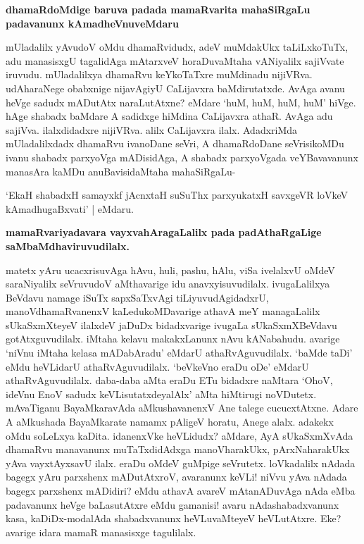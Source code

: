 {\bigskip
\noindent
{\large\bf dhamaRdoMdige baruva padada mamaRvarita mahaSiRgaLu padavanunx kAmadheVnuveMdaru}}\label{page205}
\medskip

\noindent
mUladalilx yAvudoV oMdu dhamaRvidudx, adeV muMdakUkx taLiLxkoTuTx, adu manasisxgU tagali\-dAga mAtarxveV horaDuvaMtaha vANiyalilx sajiVvate iruvudu. mUladalilxya dhamaRvu keYkoTaTxre muMdinadu nijiVRva. udAharaNege obabxnige nijavAgiyU CaLijavxra baMdirutatxde. AvAga avanu heVge sadudx mADutAtx naraLutAtxne? eMdare `huM, huM, huM, huM' hiVge. hAge shabadx baMdare A sadidx\-ge hiMdina CaLijavxra athaR. AvAga adu sajiVva. ilalxdidadxre nijiVRva. alilx CaLijavxra ilalx. AdadxriMda mUladalilxdadx dhamaRvu ivanoDane seVri, A dhamaRdoDane seVrisikoMDu ivanu shabadx parxyoVga mADi\-sidAga, A shabadx parxyoVgada veYBavavanunx manasAra kaMDu anuBavisidaMtaha mahaSiRgaLu-

\begin{shloka}
`EkaH shabadxH samayxkf jAcnxtaH suSuThx parxyukatxH savxgeVR loVkeV kAmadhugaBxvati' | eMdaru.\label{205}
\end{shloka}

{\bigskip
\noindent
{\large\bf mamaRvariyadavara vayxvahAragaLalilx pada padAthaRgaLige saMbaMdha\break\-viruvudilalx.}}\label{page205}
\medskip

\noindent
matetx yAru ucacxrisuvAga hAvu, huli, pashu, hAlu, viSa ivelalxvU oMdeV saraNiyalilx seVru\-vudoV aMthavarige idu anavxyisuvudilalx. ivugaLalilxya BeVdavu namage iSuTx sapxSaTxvAgi tiLiyuvu\-dAgidadxrU, manoVdhamaRvanenxV kaLedukoMDavarige athavA meY managaLalilx sUkaSxmXteyeV ilalxdeV jaDuDx bidadxvarige ivugaLa sUkaSxmXBeVdavu gotAtxguvudilalx. iMtaha kelavu makakxLanunx nAvu kANabahudu. avarige `niVnu iMtaha kelasa mADabAradu' eMdarU athaRvAguvudilalx. `baMde taDi' eMdu heVLi\-darU athaRvAguvudilalx. `beVkeVno eraDu oDe' eMdarU athaRvAguvudilalx. daba-daba aMta eraDu ETu bidadxre naMtara `OhoV, ideVnu EnoV sadudx keVLisutatxdeyalAlx' aMta hiMtirugi noVDutetx. mAva\-Tiganu BayaMkaravAda aMkushavanenxV Ane talege cucucxtAtxne. Adare A aMkushada BayaMkarate namamx pAligeV horatu, Anege alalx. adakekx oMdu soLeLxya kaDita. idanenxVke heVLidudx? aMdare, AyA sUkaSxmXvAda dhamaRvu manavanunx muTaTxdidAdxga manoVharakUkx, pArxNaharakUkx yAva vayxtAyxsavU ilalx. eraDu oMdeV guMpige seVrutetx. loVkadalilx nAdada bagegx yAru parxshenx mADutAtxroV, avaranunx keVLi! niVvu yAva nAdada bagegx parxshenx mADidiri? eMdu athavA avareV mAtanADuvAga nAda eMba pada\-vanunx heVge baLasutAtxre eMdu gamanisi! avaru nAdashabadxvanunx kasa, kaDiDx-modalAda shabadxvanunx heVLu\-vaMteyeV heVLutAtxre. Eke? avarige idara mamaR manasisxge tagulilalx.

